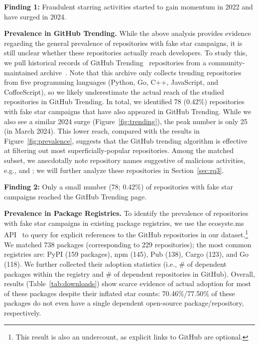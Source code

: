 \begin{summary-rq}
\textbf{Finding 1:} Fraudulent starring activities started to gain momentum in 2022 and have surged in 2024.
\end{summary-rq}

\textbf{Prevalence in GitHub Trending.}
While the above analysis provides evidence regarding the general prevalence of repositories with fake star campaigns, it is still unclear whether these repositories actually reach developers.
To study this, we pull historical records of GitHub Trending~\cite{github-trending} repositories from a community-maintained archive~\cite{trending-archive}.
Note that this archive only collects trending repositories from five programming languages (Python, Go, C++, JavaScript, and CoffeeScript), so we likely underestimate the actual reach of the studied repositories in GitHub Trending.
In total, we identified 78 (0.42\%) repositories with fake star campaigns that have also appeared in GitHub Trending.
While we also see a similar 2024 surge (Figure~\ref{fig:trending}), the peak number is only 25 (in March 2024).
This lower reach, compared with the results in Figure~\ref{fig:prevalence}, suggests that the GitHub trending algorithm is effective at filtering out most superficially-popular repositories.
Among the matched subset, we anecdotally note repository names suggestive of malicious activities, e.g.,  and ; we will further analyze these repositories in Section~\ref{sec:rq3}.

\begin{summary-rq}
\textbf{Finding 2:} 
Only a small number (78; 0.42\%) of repositories with fake star campaigns reached the GitHub Trending page.
\end{summary-rq}

\textbf{Prevalence in Package Registries.}
To identify the prevalence of repositories with fake star campaigns in existing package registries, we use the \textsf{ecosyste.ms} API~\cite{ecosystems} to query for explicit references to the GitHub repositories in our dataset.\footnote{This result is also an undercount, as explicit links to GitHub are optional.} %
We matched 738 packages (corresponding to 229 repositories); the most common registries are: PyPI (159 packages), npm (145), Pub (138), Cargo (123), and Go (118).
We further collected their adoption statistics (i.e., \# of dependent packages within the registry and \# of dependent repositories in GitHub).
Overall, results (Table~\ref{tab:downloads}) show scarce
evidence of actual adoption for most of these packages despite their inflated star counts: 70.46\%/77.50\% of these packages do not even have a single dependent open-source package/repository, respectively.

